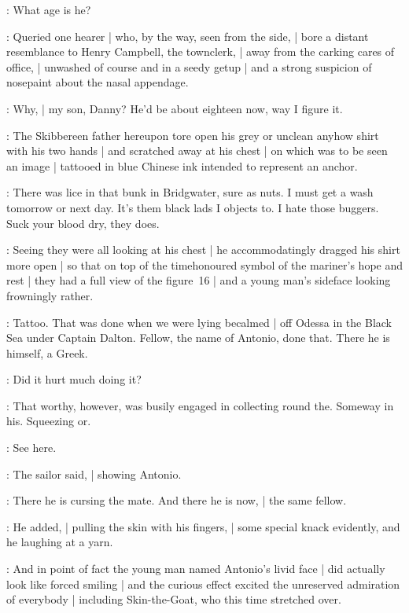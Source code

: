 \Campbell:
What age is he?

:
Queried one hearer |
who, by the way, seen from the side, |
bore a distant resemblance to Henry Campbell, the townclerk, |
away from the carking cares of office, |
unwashed of course and in a seedy getup |
and a strong suspicion of nosepaint about the nasal appendage.

\Murphy:
Why, |
my son, Danny?
He'd be about eighteen now, way I figure it.

:
The Skibbereen father
hereupon tore open his grey or unclean anyhow shirt with his two hands |
and scratched away at his chest |
on which was to be seen an image |
tattooed in blue Chinese ink intended to represent an anchor.

\Murphy:
There was lice in that bunk in Bridgwater,
sure as nuts.
I must get a wash tomorrow or next day.
It's them black lads I objects to.
I hate those buggers.
Suck your blood dry, they does.

:
Seeing they were all looking at his chest |
he accommodatingly dragged his shirt more open |
so that on top of the timehonoured symbol of the mariner's hope and rest |
they had a full view of the figure~16 |
and a young man's sideface looking frowningly rather.

\Murphy:
Tattoo.
That was done when we were lying becalmed |
off Odessa in the Black Sea under Captain Dalton.
Fellow, the name of Antonio, done that.
There he is himself, a Greek.

\Someone:
Did it hurt much doing it?

:
That worthy, however, was busily engaged in collecting round the.
Someway in his.
Squeezing or.

\Murphy:
See here.

:
The sailor said, |
showing Antonio.

\Murphy:
There he is cursing the mate.
And there he is now, |
the same fellow.

:
He added, |
pulling the skin with his fingers, |
some special knack evidently, and he laughing at a yarn.

:
And in point of fact the young man named Antonio's livid face |
did actually look like forced smiling |
and the curious effect excited the unreserved admiration of everybody |
including Skin-the-Goat, who this time stretched over.

